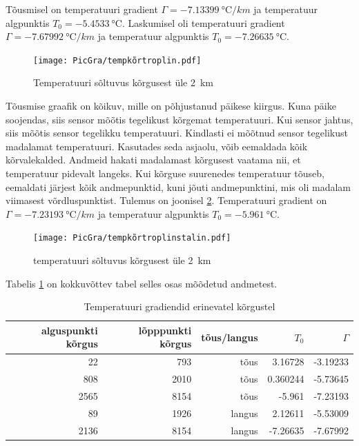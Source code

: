 \documentclass{trkut}%
\begin{document}
Tõusmisel on temperatuuri gradient $\Gamma =\SI{-7.13399}{\degreeCelsius/km}$ ja temperatuur algpunktis $T_0 = \SI{-5.4533}{\celsius}$. Laskumisel oli temperatuuri gradient $\Gamma =\SI{-7.67992}{\degreeCelsius/km}$ ja temperatuur algpunktis $T_0 = \SI{-7.26635}{\celsius}$.

\begin{figure}[h]
	\texttt{[image: PicGra/tempkõrtroplin.pdf]}
	\caption{Temperatuuri sõltuvus kõrgusest üle \SI{2}{km}}
	\label{tempkõrtroplin}%
\end{figure}

Tõusmise graafik on kõikuv, mille on põhjustanud päikese kiirgus. Kuna päike soojendas, siis sensor mõõtis tegelikust kõrgemat temperatuuri. Kui sensor jahtus, siis mõõtis sensor tegelikku temperatuuri. Kindlasti ei mõõtnud sensor tegelikust madalamat temperatuuri. Kasutades seda asjaolu, võib eemaldada kõik kõrvalekalded. Andmeid hakati madalamast kõrgusest vaatama nii, et temperatuur pidevalt langeks. Kui kõrguse suurenedes temperatuur tõuseb, eemaldati järjest kõik andmepunktid, kuni jõuti andmepunktini, mis oli madalam viimasest võrdluspunktist. Tulemus on joonisel \ref{tempkõrtroplinstalin}. Temperatuuri gradient on $\Gamma =\SI{-7.23193}{\degreeCelsius/km}$ ja temperatuur algpunktis $T_0 = \SI{-5.961}{\celsius}$.

\begin{figure}[h]
	\texttt{[image: PicGra/tempkõrtroplinstalin.pdf]}
 	\caption{temperatuuri sõltuvus kõrgusest üle \SI{2}{km}}
 	\label{tempkõrtroplinstalin}%
\end{figure}

Tabelis \ref{tabel1} on kokkuvõttev tabel selles osas mõõdetud andmetest.
\begin{table}[htb]
	\caption{Temperatuuri gradiendid erinevatel kõrgustel}
	\label{tabel1}
	\begin{tabular}{r|r|r|r|r}
		\hline
		alguspunkti kõrgus & lõpppunkti kõrgus & tõus/langus & $T_0$ & $\Gamma$ \\
		\hline
		22 & 793 & tõus & 3.16728 & -3.19233 \\
		808 & 2010 & tõus & 0.360244 & -5.73645 \\
		2565 & 8154 & tõus & -5.961 & -7.23193 \\
		89 & 1926 & langus & 2.12611 & -5.53009 \\
		2136 & 8154 & langus & -7.26635 & -7.67992
	\end{tabular}
\end{table}
\end{document}

